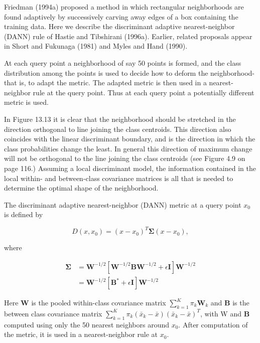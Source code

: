 \documentclass[10pt]{article}
\begin{document}
Friedman (1994a) proposed a method in which rectangular neighborhoods are found adaptively by successively carving away edges of a box containing the training data. Here we describe the discriminant adaptive nearest-neighbor (DANN) rule of Hastie and Tibshirani (1996a). Earlier, related proposals appear in Short and Fukunaga (1981) and Myles and Hand (1990).

At each query point a neighborhood of say 50 points is formed, and the class distribution among the points is used to decide how to deform the neighborhood-that is, to adapt the metric. The adapted metric is then used in a nearest-neighbor rule at the query point. Thus at each query point a potentially different metric is used.

In Figure 13.13 it is clear that the neighborhood should be stretched in the direction orthogonal to line joining the class centroids. This direction also coincides with the linear discriminant boundary, and is the direction in which the class probabilities change the least. In general this direction of maximum change will not be orthogonal to the line joining the class centroids (see Figure 4.9 on page 116.) Assuming a local discriminant model, the information contained in the local within- and between-class covariance matrices is all that is needed to determine the optimal shape of the neighborhood.

The discriminant adaptive nearest-neighbor (DANN) metric at a query point $x_{0}$ is defined by


\begin{equation*}
D\left(x, x_{0}\right)=\left(x-x_{0}\right)^{T} \boldsymbol{\Sigma}\left(x-x_{0}\right), \tag{13.8}
\end{equation*}


where


\begin{align*}
\boldsymbol{\Sigma} & =\mathbf{W}^{-1 / 2}\left[\mathbf{W}^{-1 / 2} \mathbf{B} \mathbf{W}^{-1 / 2}+\epsilon \mathbf{I}\right] \mathbf{W}^{-1 / 2} \\
& =\mathbf{W}^{-1 / 2}\left[\mathbf{B}^{*}+\epsilon \mathbf{I}\right] \mathbf{W}^{-1 / 2} \tag{13.9}
\end{align*}


Here $\mathbf{W}$ is the pooled within-class covariance matrix $\sum_{k=1}^{K} \pi_{k} \mathbf{W}_{k}$ and $\mathbf{B}$ is the between class covariance matrix $\sum_{k=1}^{K} \pi_{k}\left(\bar{x}_{k}-\bar{x}\right)\left(\bar{x}_{k}-\bar{x}\right)^{T}$, with W and $\mathbf{B}$ computed using only the 50 nearest neighbors around $x_{0}$. After computation of the metric, it is used in a nearest-neighbor rule at $x_{0}$.
\end{document}
